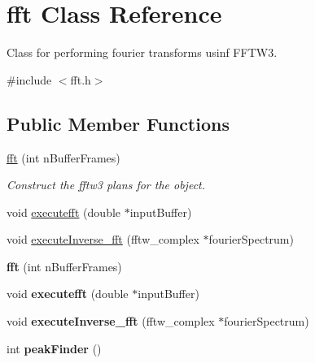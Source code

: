 \hypertarget{classfft}{\section{fft Class Reference}
\label{classfft}
}


Class for performing fourier transforms usinf F\-F\-T\-W3.  




{\ttfamily \#include $<$fft.\-h$>$}

\subsection*{Public Member Functions}
\begin{DoxyCompactItemize}
\item 
\hypertarget{classfft_a5fff94ac07119207ddd05f628be5891d}{\hyperlink{classfft_a5fff94ac07119207ddd05f628be5891d}{fft} (int n\-Buffer\-Frames)}\label{classfft_a5fff94ac07119207ddd05f628be5891d}

\begin{DoxyCompactList}\small\item\em Construct the fftw3 plans for the object. \end{DoxyCompactList}\item 
void \hyperlink{classfft_a47e58fd4f715ad89a6fad8df9d715bf4}{executefft} (double $\ast$input\-Buffer)
\item 
void \hyperlink{classfft_a228bd861564c189cd7b6800c950a1c09}{execute\-Inverse\-\_\-fft} (fftw\-\_\-complex $\ast$fourier\-Spectrum)
\item 
\hypertarget{classfft_a5fff94ac07119207ddd05f628be5891d}{{\bfseries fft} (int n\-Buffer\-Frames)}\label{classfft_a5fff94ac07119207ddd05f628be5891d}

\item 
\hypertarget{classfft_a47e58fd4f715ad89a6fad8df9d715bf4}{void {\bfseries executefft} (double $\ast$input\-Buffer)}\label{classfft_a47e58fd4f715ad89a6fad8df9d715bf4}

\item 
\hypertarget{classfft_a228bd861564c189cd7b6800c950a1c09}{void {\bfseries execute\-Inverse\-\_\-fft} (fftw\-\_\-complex $\ast$fourier\-Spectrum)}\label{classfft_a228bd861564c189cd7b6800c950a1c09}

\item 
\hypertarget{classfft_acd506cabf787a130ba123c29224f5488}{int {\bfseries peak\-Finder} ()}\label{classfft_acd506cabf787a130ba123c29224f5488}


\end{DoxyCompactItemize}
